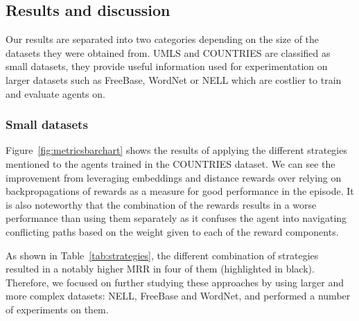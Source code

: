 

\subsection{Results and discussion}

Our results are separated into two categories depending on the size of the datasets they were obtained from. UMLS and COUNTRIES are classified as small datasets, they provide useful information used for experimentation on larger datasets such as FreeBase, WordNet or NELL which are costlier to train and evaluate agents on.

\subsubsection{Small datasets} \label{sssec:smalldatasets}
Figure~\ref{fig:metricsbarchart} shows the results of applying the different strategies mentioned to the agents trained in the COUNTRIES dataset. We can see the improvement from leveraging embeddings and distance rewards over relying on backpropagations of rewards as a measure for good performance in the episode. It is also noteworthy that the combination of the rewards results in a worse performance than using them separately as it confuses the agent into navigating conflicting paths based on the weight given to each of the reward components.

As shown in Table~\ref{tab:strategies}, the different combination of strategies resulted in a notably higher MRR in four of them (highlighted in black). Therefore, we focused on further studying these approaches by using larger and more complex datasets: NELL, FreeBase and WordNet, and performed a number of experiments on them. 

